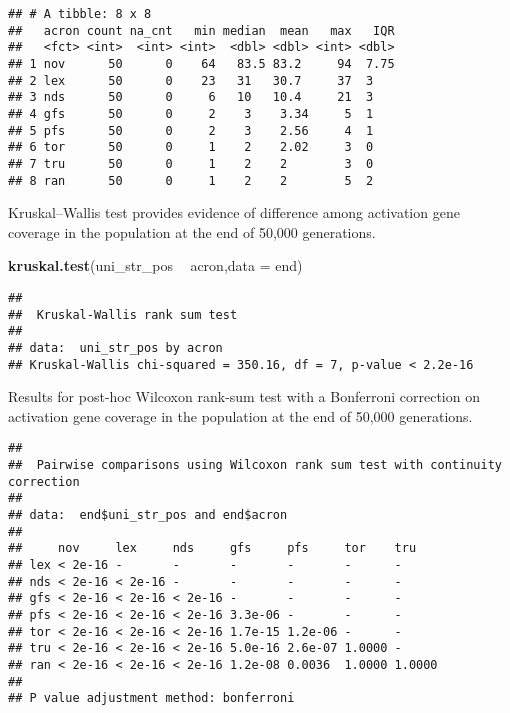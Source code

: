 \documentclass[]{book}
\newenvironment{Shaded}{\begin{snugshade}}{\end{snugshade}}
\newcommand{\DataTypeTok}[1]{\textcolor[rgb]{0.13,0.29,0.53}{#1}}
\newcommand{\KeywordTok}[1]{\textcolor[rgb]{0.13,0.29,0.53}{\textbf{#1}}}
\newcommand{\NormalTok}[1]{#1}
\newcommand{\OperatorTok}[1]{\textcolor[rgb]{0.81,0.36,0.00}{\textbf{#1}}}
\newcommand{\OtherTok}[1]{\textcolor[rgb]{0.56,0.35,0.01}{#1}}
\newcommand{\StringTok}[1]{\textcolor[rgb]{0.31,0.60,0.02}{#1}}
\begin{document}
\begin{verbatim}
## # A tibble: 8 x 8
##   acron count na_cnt   min median  mean   max   IQR
##   <fct> <int>  <int> <int>  <dbl> <dbl> <int> <dbl>
## 1 nov      50      0    64   83.5 83.2     94  7.75
## 2 lex      50      0    23   31   30.7     37  3   
## 3 nds      50      0     6   10   10.4     21  3   
## 4 gfs      50      0     2    3    3.34     5  1   
## 5 pfs      50      0     2    3    2.56     4  1   
## 6 tor      50      0     1    2    2.02     3  0   
## 7 tru      50      0     1    2    2        3  0   
## 8 ran      50      0     1    2    2        5  2
\end{verbatim}

Kruskal--Wallis test provides evidence of difference among activation gene coverage in the population at the end of 50,000 generations.

\begin{Shaded}
\begin{Highlighting}[]
\KeywordTok{kruskal.test}\NormalTok{(uni_str_pos }\OperatorTok{~}\StringTok{ }\NormalTok{acron,}\DataTypeTok{data =}\NormalTok{ end)}
\end{Highlighting}
\end{Shaded}

\begin{verbatim}
## 
##  Kruskal-Wallis rank sum test
## 
## data:  uni_str_pos by acron
## Kruskal-Wallis chi-squared = 350.16, df = 7, p-value < 2.2e-16
\end{verbatim}

Results for post-hoc Wilcoxon rank-sum test with a Bonferroni correction on activation gene coverage in the population at the end of 50,000 generations.

\begin{Shaded}
\end{Shaded}

\begin{verbatim}
## 
##  Pairwise comparisons using Wilcoxon rank sum test with continuity correction 
## 
## data:  end$uni_str_pos and end$acron 
## 
##     nov     lex     nds     gfs     pfs     tor    tru   
## lex < 2e-16 -       -       -       -       -      -     
## nds < 2e-16 < 2e-16 -       -       -       -      -     
## gfs < 2e-16 < 2e-16 < 2e-16 -       -       -      -     
## pfs < 2e-16 < 2e-16 < 2e-16 3.3e-06 -       -      -     
## tor < 2e-16 < 2e-16 < 2e-16 1.7e-15 1.2e-06 -      -     
## tru < 2e-16 < 2e-16 < 2e-16 5.0e-16 2.6e-07 1.0000 -     
## ran < 2e-16 < 2e-16 < 2e-16 1.2e-08 0.0036  1.0000 1.0000
## 
## P value adjustment method: bonferroni
\end{verbatim}
\end{document}
